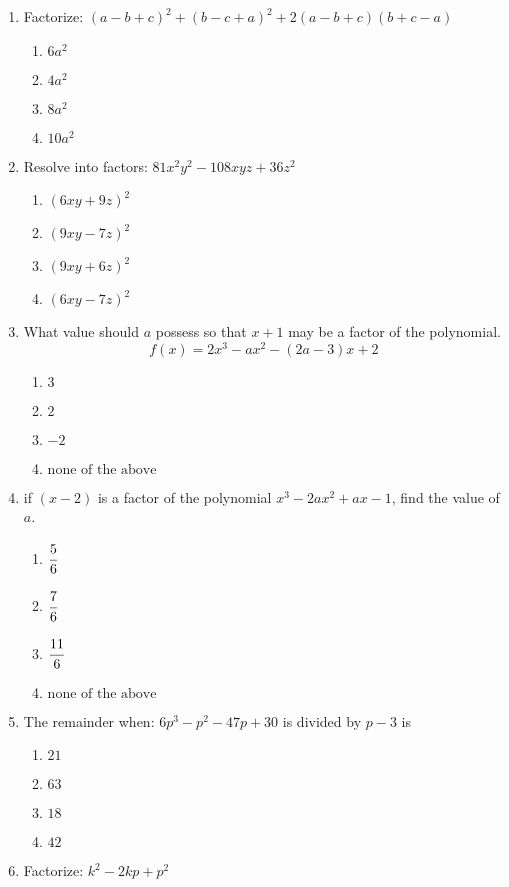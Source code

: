 \begin{multicols}{2}
\begin{enumerate}[label={\arabic*.}]
\item Factorize: $(a-b+c)^2 + (b-c+a)^2 + 2(a -b +c)(b+c-a)$
	\begin{enumerate}[label={\Alph*.}]
	\item \(6a^2\)
	\item \(4a^2\)
	\item \(8a^2\)
	\item \(10a^2\)
	\end{enumerate}
\item Resolve into factors: $81x^2y^2 - 108xyz + 36z^2$
	\begin{enumerate}[label={\Alph*.}]
	\item \((6xy + 9z)^2\)
	\item \((9xy - 7z)^2\)
	\item \((9xy + 6z)^2\)
	\item \((6xy - 7z)^2\)
	\end{enumerate}
\item What value should $a$ possess so that $x+1$ may be a factor of the polynomial. 
$$f(x) = 2x^3 - ax^2 - (2a -3)x + 2$$
	\begin{enumerate}[label={\Alph*.}]
	\item \(3\)
	\item \(2\)
	\item \(-2\)
	\item \(\text{none of the above}\)
	\end{enumerate}
\item if $(x-2)$ is a factor of the polynomial $x^3 - 2ax^2 +ax -1$, find the value of $a$.
	\begin{enumerate}[label={\Alph*.}]
	\item \(\cfrac{5}{6}\)
	\item \(\cfrac{7}{6}\)
	\item \(\cfrac{11}{6}\)
	\item \(\text{none of the above}\)
	\end{enumerate}
\item The remainder when: $6p^3 - p^2 -47p + 30$ is divided by $p-3$ is 	
\begin{enumerate}[label={\Alph*.}]
	\item \(21\)
	\item \(63\)
	\item \(18\)
	\item \(42\)
	\end{enumerate}
\item Factorize: $k^2 - 2kp + p^2$
	\begin{enumerate}[label={\Alph*.}]

\end{enumerate}
\end{enumerate}
\end{multicols}
